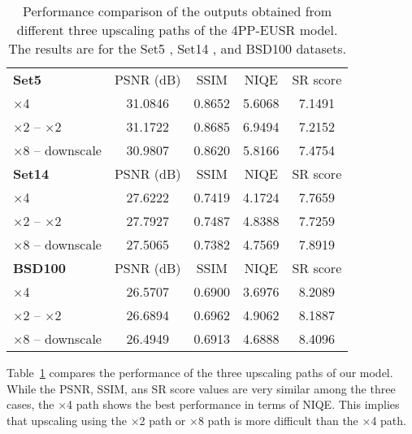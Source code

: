 \documentclass[runningheads]{llncs}
\begin{document}
\begin{table}[t]
	\scriptsize
	\centering
	\caption{Performance comparison of the outputs obtained from different three upscaling paths of the 4PP-EUSR model. The results are for the Set5 \cite{bevilacqua2012low}, Set14 \cite{zeyde2010single}, and BSD100 \cite{martin2001database} datasets.}
	\label{table:result_upscale_path_comparison}
	\begin{tabular}{lcccc}
		\\
		\textbf{Set5} & PSNR (dB) & SSIM & NIQE & SR score \\
		\noalign{\smallskip}
		\hline
		\noalign{\smallskip}
		$\times$4 & 31.0846 & 0.8652 & 5.6068 & 7.1491 \\
		$\times$2 -- $\times$2 & 31.1722 & 0.8685 & 6.9494 & 7.2152 \\
		$\times$8 -- downscale & 30.9807 & 0.8620 & 5.8166 & 7.4754 \\
		\noalign{\smallskip}
		\noalign{\smallskip}
		\textbf{Set14} & PSNR (dB) & SSIM & NIQE & SR score \\
		\noalign{\smallskip}
		\hline
		\noalign{\smallskip}
		$\times$4 & 27.6222 & 0.7419 & 4.1724 & 7.7659 \\
		$\times$2 -- $\times$2 & 27.7927 & 0.7487 & 4.8388 & 7.7259 \\
		$\times$8 -- downscale & 27.5065 & 0.7382 & 4.7569 & 7.8919 \\
		\noalign{\smallskip}
		\noalign{\smallskip}
		\textbf{BSD100} & PSNR (dB) & SSIM & NIQE & SR score \\
		\noalign{\smallskip}
		\hline
		\noalign{\smallskip}
		$\times$4 & 26.5707 & 0.6900 & 3.6976 & 8.2089 \\
		$\times$2 -- $\times$2 & 26.6894 & 0.6962 & 4.9062 & 8.1887 \\
		$\times$8 -- downscale & 26.4949 & 0.6913 & 4.6888 & 8.4096
	\end{tabular}
\end{table}

Table~\ref{table:result_upscale_path_comparison} compares the performance of the three upscaling paths of our model.
While the PSNR, SSIM, ans SR score values are very similar among the three cases, the $\times$4 path shows the best performance in terms of NIQE.
This implies that upscaling using the $\times$2 path or $\times$8 path is more difficult than the $\times$4 path.
\end{document}
